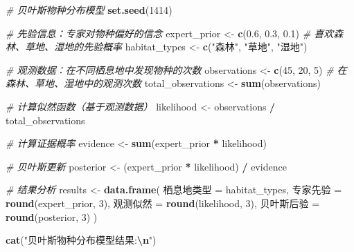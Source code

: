 \documentclass[
  twoside]{book}
\newenvironment{Shaded}{\begin{snugshade}}{\end{snugshade}}
\newcommand{\CommentTok}[1]{\textcolor[rgb]{0.56,0.35,0.01}{\textit{#1}}}
\newcommand{\DecValTok}[1]{\textcolor[rgb]{0.00,0.00,0.81}{#1}}
\newcommand{\FloatTok}[1]{\textcolor[rgb]{0.00,0.00,0.81}{#1}}
\newcommand{\FunctionTok}[1]{\textcolor[rgb]{0.13,0.29,0.53}{\textbf{#1}}}
\newcommand{\NormalTok}[1]{#1}
\newcommand{\OtherTok}[1]{\textcolor[rgb]{0.56,0.35,0.01}{#1}}
\newcommand{\SpecialCharTok}[1]{\textcolor[rgb]{0.81,0.36,0.00}{\textbf{#1}}}
\newcommand{\StringTok}[1]{\textcolor[rgb]{0.31,0.60,0.02}{#1}}
\begin{document}
\begin{Shaded}
\begin{Highlighting}[]
\CommentTok{\# 贝叶斯物种分布模型}
\FunctionTok{set.seed}\NormalTok{(}\DecValTok{1414}\NormalTok{)}

\CommentTok{\# 先验信息：专家对物种偏好的信念}
\NormalTok{expert\_prior }\OtherTok{\textless{}{-}} \FunctionTok{c}\NormalTok{(}\FloatTok{0.6}\NormalTok{, }\FloatTok{0.3}\NormalTok{, }\FloatTok{0.1}\NormalTok{)  }\CommentTok{\# 喜欢森林、草地、湿地的先验概率}
\NormalTok{habitat\_types }\OtherTok{\textless{}{-}} \FunctionTok{c}\NormalTok{(}\StringTok{"森林"}\NormalTok{, }\StringTok{"草地"}\NormalTok{, }\StringTok{"湿地"}\NormalTok{)}

\CommentTok{\# 观测数据：在不同栖息地中发现物种的次数}
\NormalTok{observations }\OtherTok{\textless{}{-}} \FunctionTok{c}\NormalTok{(}\DecValTok{45}\NormalTok{, }\DecValTok{20}\NormalTok{, }\DecValTok{5}\NormalTok{)      }\CommentTok{\# 在森林、草地、湿地中的观测次数}
\NormalTok{total\_observations }\OtherTok{\textless{}{-}} \FunctionTok{sum}\NormalTok{(observations)}

\CommentTok{\# 计算似然函数（基于观测数据）}
\NormalTok{likelihood }\OtherTok{\textless{}{-}}\NormalTok{ observations }\SpecialCharTok{/}\NormalTok{ total\_observations}

\CommentTok{\# 计算证据概率}
\NormalTok{evidence }\OtherTok{\textless{}{-}} \FunctionTok{sum}\NormalTok{(expert\_prior }\SpecialCharTok{*}\NormalTok{ likelihood)}

\CommentTok{\# 贝叶斯更新}
\NormalTok{posterior }\OtherTok{\textless{}{-}}\NormalTok{ (expert\_prior }\SpecialCharTok{*}\NormalTok{ likelihood) }\SpecialCharTok{/}\NormalTok{ evidence}

\CommentTok{\# 结果分析}
\NormalTok{results }\OtherTok{\textless{}{-}} \FunctionTok{data.frame}\NormalTok{(}
\NormalTok{  栖息地类型 }\OtherTok{=}\NormalTok{ habitat\_types,}
\NormalTok{  专家先验 }\OtherTok{=} \FunctionTok{round}\NormalTok{(expert\_prior, }\DecValTok{3}\NormalTok{),}
\NormalTok{  观测似然 }\OtherTok{=} \FunctionTok{round}\NormalTok{(likelihood, }\DecValTok{3}\NormalTok{),}
\NormalTok{  贝叶斯后验 }\OtherTok{=} \FunctionTok{round}\NormalTok{(posterior, }\DecValTok{3}\NormalTok{)}
\NormalTok{)}

\FunctionTok{cat}\NormalTok{(}\StringTok{"贝叶斯物种分布模型结果:}\SpecialCharTok{\textbackslash{}n}\StringTok{"}\NormalTok{)}
\end{Highlighting}
\end{Shaded}
\end{document}
